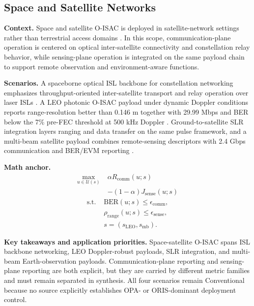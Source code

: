 \documentclass[lettersize,journal]{IEEEtran}
\begin{document}
\subsection{Space and Satellite Networks}

\textbf{Context.} Space and satellite O-ISAC is deployed in satellite-network settings rather than terrestrial access domains \cite{O_ISAC_089,O_ISAC_137,O_ISAC_187,O_ISAC_195}. In this scope, communication-plane operation is centered on optical inter-satellite connectivity and constellation relay behavior, while sensing-plane operation is integrated on the same payload chain to support remote observation and environment-aware functions.

\textbf{Scenarios.} A spaceborne optical ISL backbone for constellation networking emphasizes throughput-oriented inter-satellite transport and relay operation over laser ISLs \cite{O_ISAC_089}. A LEO photonic O-ISAC payload under dynamic Doppler conditions reports range-resolution better than 0.146 m together with 29.99 Mbps and BER below the 7\% pre-FEC threshold at 500 kHz Doppler \cite{O_ISAC_187}. Ground-to-satellite SLR integration layers ranging and data transfer on the same pulse framework, and a multi-beam satellite payload combines remote-sensing descriptors with 2.4 Gbps communication and BER/EVM reporting \cite{O_ISAC_137,O_ISAC_195}.

\textbf{Math anchor.}
\begin{equation}
\begin{split}
\max_{u\in\mathcal{U}(s)}\;&\alpha R_{\mathrm{comm}}(u;s)\\
&-(1-\alpha)J_{\mathrm{sense}}(u;s)
\end{split}
\end{equation}
\begin{equation}
\begin{split}
\text{s.t. } &\mathrm{BER}(u;s)\le\epsilon_{\mathrm{comm}},\\
&\rho_{\mathrm{range}}(u;s)\le\epsilon_{\mathrm{sense}},\\
&s=(s_{\mathrm{LEO}},s_{\mathrm{mb}}).
\end{split}
\end{equation}

\textbf{Key takeaways and application priorities.} Space-satellite O-ISAC spans ISL backbone networking, LEO Doppler-robust payloads, SLR integration, and multi-beam Earth-observation payloads. Communication-plane reporting and sensing-plane reporting are both explicit, but they are carried by different metric families and must remain separated in synthesis. All four scenarios remain Conventional because no source explicitly establishes OPA- or ORIS-dominant deployment control.
\end{document}
